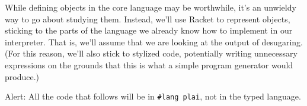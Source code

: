 
While defining objects in the core language may be worthwhile, it’s an unwieldy
way to go about studying them. Instead, we’ll use Racket to represent objects,
sticking to the parts of the language we already know how to implement in our
interpreter. That is, we’ll assume that we are looking at the output of
desugaring. (For this reason, we’ll also stick to stylized code, potentially
writing unnecessary expressions on the grounds that this is what a simple
program generator would produce.)

\begin{framed}
Alert: All the code that follows will be in \verb|#lang plai|, not in the typed
language.
\end{framed}

